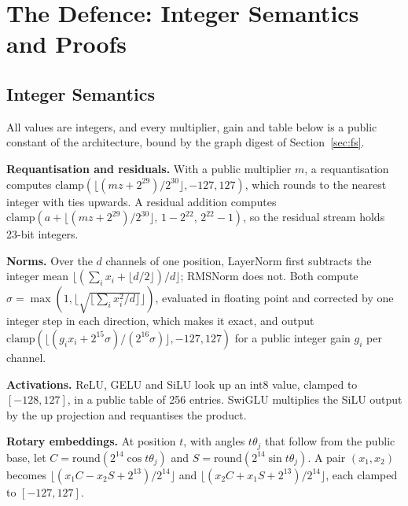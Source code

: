 \providecommand{\F}{\mathbb{F}_p}
\providecommand{\enc}{\mathrm{Enc}}
\providecommand{\T}{\top}
\providecommand{\sC}{\mathsf{C}}
\providecommand{\sK}{\mathsf{K}}
\providecommand{\Kpre}{\mathsf{K}_{\mathrm{pre}}}
\providecommand{\para}[1]{\par\noindent\textbf{#1}\quad}
\providecommand{\qed}{\hfill$\square$}
\makeatletter
\@ifundefined{proof}{\newenvironment{proof}[1][Proof]{\par\noindent\emph{#1.}\ }{\qed\par}}{}
\makeatother

\section{The Defence: Integer Semantics and Proofs}
\label{app:defence}

\subsection{Integer Semantics}
\label{app:semantics}

All values are integers, and every multiplier, gain and table below is a public constant of the
architecture, bound by the graph digest of Section~\ref{sec:fs}.

\para{Requantisation and residuals.} With a public multiplier $m$, a requantisation computes
$\mathrm{clamp}(\lfloor(mz+2^{29})/2^{30}\rfloor,-127,127)$, which rounds to the nearest integer with
ties upwards. A residual addition computes
$\mathrm{clamp}(a+\lfloor(mz+2^{29})/2^{30}\rfloor,\,1-2^{22},\,2^{22}-1)$, so the residual stream
holds 23-bit integers.

\para{Norms.} Over the $d$ channels of one position, LayerNorm first subtracts the integer mean
$\lfloor(\sum_ix_i+\lfloor d/2\rfloor)/d\rfloor$; RMSNorm does not. Both compute
$\sigma=\max(1,\lfloor\sqrt{\lfloor\sum_ix_i^2/d\rfloor}\rfloor)$, evaluated in floating point and
corrected by one integer step in each direction, which makes it exact, and output
$\mathrm{clamp}(\lfloor(g_ix_i+2^{15}\sigma)/(2^{16}\sigma)\rfloor,-127,127)$ for a public integer
gain $g_i$ per channel.

\para{Activations.} ReLU, GELU and SiLU look up an int8 value, clamped to $[-128,127]$, in a public
table of 256 entries. SwiGLU multiplies the SiLU output by the up projection and requantises the
product.

\para{Rotary embeddings.} At position $t$, with angles $t\theta_j$ that follow from the public base,
let $C=\mathrm{round}(2^{14}\cos t\theta_j)$ and $S=\mathrm{round}(2^{14}\sin t\theta_j)$. A pair
$(x_1,x_2)$ becomes $\lfloor(x_1C-x_2S+2^{13})/2^{14}\rfloor$ and
$\lfloor(x_2C+x_1S+2^{13})/2^{14}\rfloor$, each clamped to $[-127,127]$.

